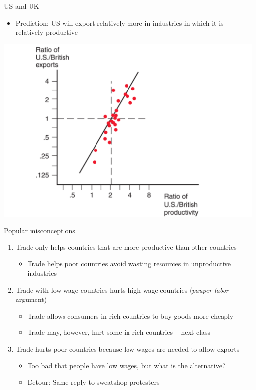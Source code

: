 \documentclass[ignorenonframetext,]{beamer}
\begin{document}
\begin{frame}{US and UK}

    \begin{itemize}
        \item Prediction: US will export relatively more in industries in which it is relatively productive
    \end{itemize}
    \includegraphics[scale=0.20]{brit_us_exports.png}

\end{frame}

\begin{frame}{Popular misconceptions}

    \begin{enumerate}
        \item Trade only helps countries that are more productive than other countries
        \begin{itemize}
            \item Trade helps poor countries avoid wasting resources in unproductive industries
        \end{itemize}
        \item Trade with low wage countries hurts high wage countries (\emph{pauper labor} argument)
        \begin{itemize}
        \item Trade allows consumers in rich countries to buy goods more cheaply
        \item Trade may, however, hurt some in rich countries -- next class
        \end{itemize}
        \item Trade hurts poor countries because low wages are needed to allow exports
        \begin{itemize}
            \item Too bad that people have low wages, but what is the alternative?
            \item Detour: Same reply to sweatshop protesters
        \end{itemize}
    \end{enumerate}

\end{frame}
\end{document}
